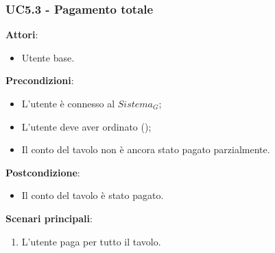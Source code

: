 \subsubsection{UC5.3 - Pagamento totale}\label{usecase:5.3}
\textbf{Attori}:
\begin{itemize}
    \item Utente base.
\end{itemize}
\textbf{Precondizioni}:
\begin{itemize}
    \item L'utente è connesso al $\textit{Sistema}_G$;
    \item L'utente deve aver ordinato ();
    \item Il conto del tavolo non è ancora stato pagato parzialmente.
\end{itemize}
\textbf{Postcondizione}:
\begin{itemize}
    \item Il conto del tavolo è stato pagato.
\end{itemize}
\textbf{Scenari principali}:
\begin{enumerate}
    \item L'utente paga per tutto il tavolo.
\end{enumerate}